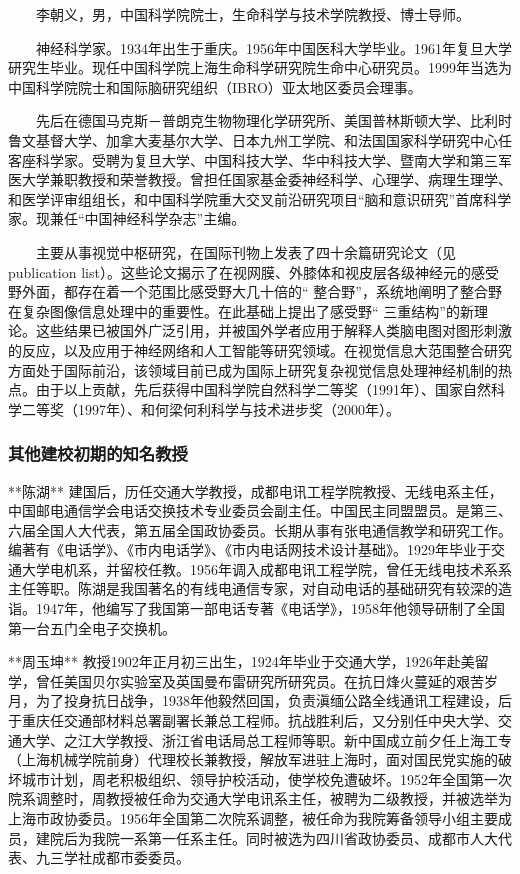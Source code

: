 \documentclass[UTF8]{ctexart}
\begin{document}
　　李朝义，男，中国科学院院士，生命科学与技术学院教授、博士导师。

　　神经科学家。1934年出生于重庆。1956年中国医科大学毕业。1961年复旦大学研究生毕业。现任中国科学院上海生命科学研究院生命中心研究员。1999年当选为中国科学院院士和国际脑研究组织（IBRO）亚太地区委员会理事。

　　先后在德国马克斯－普朗克生物物理化学研究所、美国普林斯顿大学、比利时鲁文基督大学、加拿大麦基尔大学、日本九州工学院、和法国国家科学研究中心任客座科学家。受聘为复旦大学、中国科技大学、华中科技大学、暨南大学和第三军医大学兼职教授和荣誉教授。曾担任国家基金委神经科学、心理学、病理生理学、和医学评审组组长，和中国科学院重大交叉前沿研究项目“脑和意识研究”首席科学家。现兼任“中国神经科学杂志”主编。

　　主要从事视觉中枢研究，在国际刊物上发表了四十余篇研究论文（见publication list）。这些论文揭示了在视网膜、外膝体和视皮层各级神经元的感受野外面，都存在着一个范围比感受野大几十倍的“ 整合野”，系统地阐明了整合野在复杂图像信息处理中的重要性。在此基础上提出了感受野“ 三重结构”的新理论。这些结果已被国外广泛引用，并被国外学者应用于解释人类脑电图对图形刺激的反应，以及应用于神经网络和人工智能等研究领域。在视觉信息大范围整合研究方面处于国际前沿，该领域目前已成为国际上研究复杂视觉信息处理神经机制的热点。由于以上贡献，先后获得中国科学院自然科学二等奖（1991年）、国家自然科学二等奖（1997年）、和何梁何利科学与技术进步奖（2000年）。

    \subsubsection{其他建校初期的知名教授}
**陈湖** 建国后，历任交通大学教授，成都电讯工程学院教授、无线电系主任，中国邮电通信学会电话交换技术专业委员会副主任。中国民主同盟盟员。是第三、六届全国人大代表，第五届全国政协委员。长期从事有张电通信教学和研究工作。编著有《电话学》、《市内电话学》、《市内电话网技术设计基础》。1929年毕业于交通大学电机系，并留校任教。1956年调入成都电讯工程学院，曾任无线电技术系系主任等职。陈湖是我国著名的有线电通信专家，对自动电话的基础研究有较深的造诣。1947年，他编写了我国第一部电话专著《电话学》，1958年他领导研制了全国第一台五门全电子交换机。

**周玉坤** 教授1902年正月初三出生，1924年毕业于交通大学，1926年赴美留学，曾任美国贝尔实验室及英国曼布雷研究所研究员。在抗日烽火蔓延的艰苦岁月，为了投身抗日战争，1938年他毅然回国，负责滇缅公路全线通讯工程建设，后于重庆任交通部材料总署副署长兼总工程师。抗战胜利后，又分别任中央大学、交通大学、之江大学教授、浙江省电话局总工程师等职。新中国成立前夕任上海工专（上海机械学院前身）代理校长兼教授，解放军进驻上海时，面对国民党实施的破坏城市计划，周老积极组织、领导护校活动，使学校免遭破坏。1952年全国第一次院系调整时，周教授被任命为交通大学电讯系主任，被聘为二级教授，并被选举为上海市政协委员。1956年全国第二次院系调整，被任命为我院筹备领导小组主要成员，建院后为我院一系第一任系主任。同时被选为四川省政协委员、成都市人大代表、九三学社成都市委委员。
\end{document}
